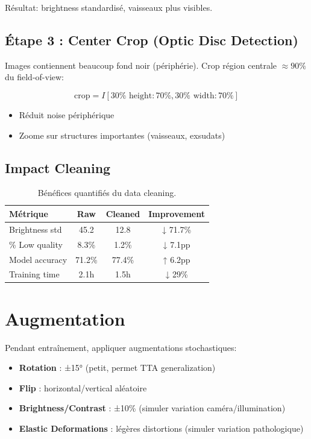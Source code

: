 \documentclass[12pt,a4paper,oneside]{report}
\begin{document}
Résultat: brightness standardisé, vaisseaux plus visibles.

\subsection{Étape 3 : Center Crop (Optic Disc Detection)}

Images contiennent beaucoup fond noir (périphérie). Crop région centrale 
$\approx 90\%$ du field-of-view:

\begin{equation}
\text{crop} = I[30\% \text{ height}:70\%, 30\% \text{ width}:70\%]
\end{equation}

\begin{itemize}
    \item Réduit noise périphérique
    \item Zoome sur structures importantes (vaisseaux, exsudats)
\end{itemize}

\subsection{Impact Cleaning}

\begin{table}[H]
\centering
\begin{tabular}{|l|c|c|c|}
\hline
Métrique & Raw & Cleaned & Improvement \\
\hline
Brightness std & 45.2 & 12.8 & ↓ 71.7\% \\
\% Low quality & 8.3\% & 1.2\% & ↓ 7.1pp \\
Model accuracy & 71.2\% & 77.4\% & ↑ 6.2pp \\
Training time & 2.1h & 1.5h & ↓ 29\% \\
\hline
\end{tabular}
\caption{Bénéfices quantifiés du data cleaning.}
\label{tab:cleaning_impact}
\end{table}

\section{Augmentation}

Pendant entraînement, appliquer augmentations stochastiques:

\begin{itemize}
    \item \textbf{Rotation} : ±15° (petit, permet TTA generalization)
    \item \textbf{Flip} : horizontal/vertical aléatoire
    \item \textbf{Brightness/Contrast} : ±10\% (simuler variation 
          caméra/illumination)
    \item \textbf{Elastic Deformations} : légères distortions 
          (simuler variation pathologique)
\end{itemize}
\end{document}

